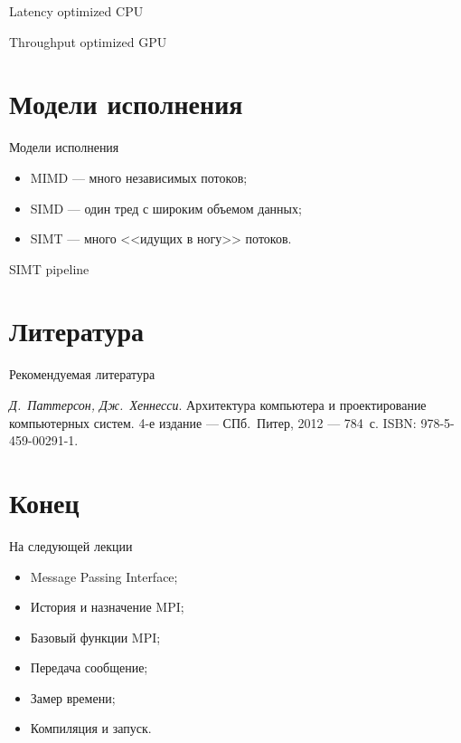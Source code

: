 \begin{frame}
Latency optimized CPU

Throughput optimized GPU
\end{frame}

\section{Модели исполнения}

\begin{frame}{Модели исполнения}
\begin{itemize}
    \item MIMD --- много независимых потоков;
    \item SIMD --- один тред с широким объемом данных;
    \item SIMT --- много <<идущих в ногу>> потоков.
\end{itemize}
\end{frame}

\begin{frame}{SIMT pipeline}
\centering
{}
\end{frame}

\section*{Литература}

\begin{frame}{Рекомендуемая литература}
\begin{thebibliography}{99}
    \bibitem{} \textit{Д.~Паттерсон, Дж.~Хеннесси}. Архитектура компьютера и
    проектирование компьютерных систем. 4-е издание --- СПб.~Питер, 2012 ---
    784~с. ISBN: 978-5-459-00291-1.
\end{thebibliography}
\end{frame}

\section*{Конец}

\begin{frame}{На следующей лекции}
\begin{itemize}
\ifsbertech
    \item Message Passing Interface;
    \item История и назначение MPI;
    \item Базовый функции MPI;
    \item Передача сообщение;
    \item Замер времени;
    \item Компиляция и запуск.
\fi
\end{itemize}
\end{frame}


